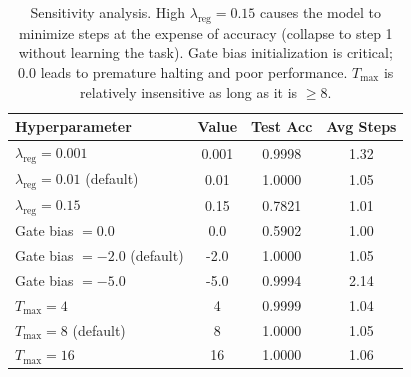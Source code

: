 \documentclass[11pt]{article}
\begin{document}
\begin{table}[H]
\centering
\small
\begin{tabular}{lccc}
\toprule
\textbf{Hyperparameter} & \textbf{Value} & \textbf{Test Acc} & \textbf{Avg Steps} \\
\midrule
$\lambda_{\text{reg}} = 0.001$ & 0.001 & 0.9998 & 1.32 \\
$\lambda_{\text{reg}} = 0.01$ (default) & 0.01 & 1.0000 & 1.05 \\
$\lambda_{\text{reg}} = 0.15$ & 0.15 & 0.7821 & 1.01 \\
\midrule
Gate bias $= 0.0$ & 0.0 & 0.5902 & 1.00 \\
Gate bias $= -2.0$ (default) & -2.0 & 1.0000 & 1.05 \\
Gate bias $= -5.0$ & -5.0 & 0.9994 & 2.14 \\
\midrule
$T_{\max} = 4$ & 4 & 0.9999 & 1.04 \\
$T_{\max} = 8$ (default) & 8 & 1.0000 & 1.05 \\
$T_{\max} = 16$ & 16 & 1.0000 & 1.06 \\
\bottomrule
\end{tabular}
\caption{Sensitivity analysis. High $\lambda_{\text{reg}} = 0.15$ causes the model to minimize steps at the expense of accuracy (collapse to step 1 without learning the task). Gate bias initialization is critical; $0.0$ leads to premature halting and poor performance. $T_{\max}$ is relatively insensitive as long as it is $\geq 8$.}
\label{tab:hyperparam}
\end{table}
\end{document}
